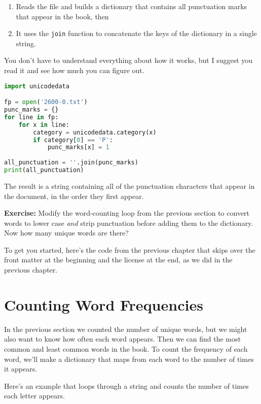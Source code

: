 \begin{enumerate}
\def\labelenumi{\arabic{enumi}.}
\item
  Reads the file and builds a dictionary that contains all punctuation
  marks that appear in the book, then
\item
  It uses the \passthrough{\lstinline!join!} function to concatenate the
  keys of the dictionary in a single string.
\end{enumerate}

You don't have to understand everything about how it works, but I
suggest you read it and see how much you can figure out.

\begin{lstlisting}[language=Python,style=source]
import unicodedata

fp = open('2600-0.txt')
punc_marks = {}
for line in fp:
    for x in line:
        category = unicodedata.category(x)
        if category[0] == 'P':
            punc_marks[x] = 1
        
all_punctuation = ''.join(punc_marks)
print(all_punctuation)
\end{lstlisting}

The result is a string containing all of the punctuation characters that
appear in the document, in the order they first appear.

\textbf{Exercise:} Modify the word-counting loop from the previous
section to convert words to lower case \emph{and} strip punctuation
before adding them to the dictionary. Now how many unique words are
there?

To get you started, here's the code from the previous chapter that skips
over the front matter at the beginning and the license at the end, as we
did in the previous chapter.

\hypertarget{counting-word-frequencies}{%
\section{Counting Word Frequencies}\label{counting-word-frequencies}}

In the previous section we counted the number of unique words, but we
might also want to know how often each word appears. Then we can find
the most common and least common words in the book. To count the
frequency of each word, we'll make a dictionary that maps from each word
to the number of times it appears.

Here's an example that loops through a string and counts the number of
times each letter appears.

